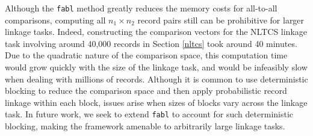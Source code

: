 \documentclass[ba]{imsart}
\begin{document}
	Although the \texttt{fabl} method greatly reduces the memory costs for all-to-all comparisons, computing all $n_1 \times n_2$ record pairs still can be prohibitive for larger linkage tasks. Indeed, constructing the comparison vectors for the NLTCS linkage task involving around 40,000 records in Section \ref{nltcs} took around 40 minutes. Due to the quadratic nature of the comparison space, this computation time would grow quickly with the size of the linkage task, and would be infeasibly slow when dealing with millions of records. Although it is common to use deterministic blocking to reduce the comparison space and then apply probabilistic record linkage within each block, issues arise when sizes of blocks vary across the linkage task. In future work, we seek to extend \texttt{fabl} to account for such deterministic blocking, making the framework amenable to arbitrarily large linkage tasks.
	

	
\end{document}
